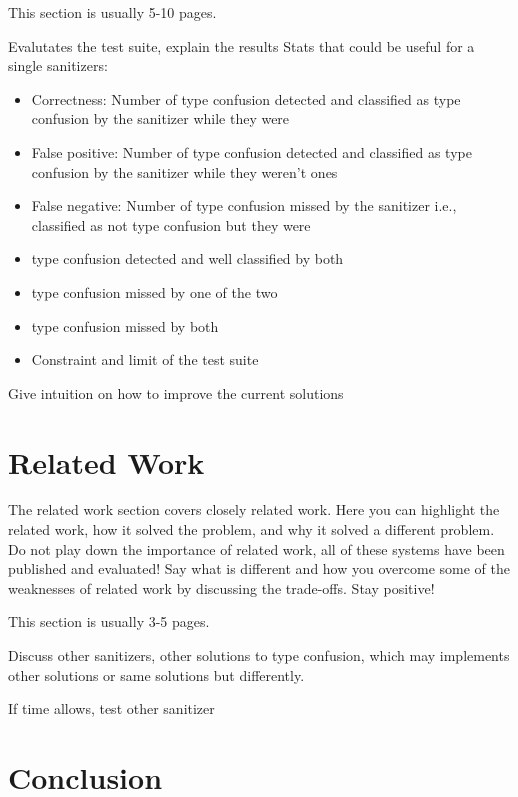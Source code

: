 \documentclass[a4paper,11pt,oneside]{report}
\begin{document}
This section is usually 5-10 pages.

Evalutates the test suite, explain the results
Stats that could be useful for a single sanitizers:
\begin{itemize}
       \item Correctness: Number of type confusion detected and classified as type confusion by the sanitizer while they were
       \item False positive: Number of type confusion detected and classified as type confusion by the sanitizer while they weren't ones
       \item False negative: Number of type confusion missed by the sanitizer i.e., classified as not type confusion but they were

       \item type confusion detected and well classified by both
       \item type confusion missed by one of the two
       \item type confusion missed by both

       \item Constraint and limit of the test suite

\end{itemize}

Give intuition on how to improve the current solutions

\chapter{Related Work}

The related work section covers closely related work. Here you can highlight
the related work, how it solved the problem, and why it solved a different
problem. Do not play down the importance of related work, all of these
systems have been published and evaluated! Say what is different and how
you overcome some of the weaknesses of related work by discussing the 
trade-offs. Stay positive!

This section is usually 3-5 pages.

Discuss other sanitizers, other solutions to type confusion,
which may implements other solutions or same solutions but differently.

If time allows, test other sanitizer




\chapter{Conclusion}
\end{document}
